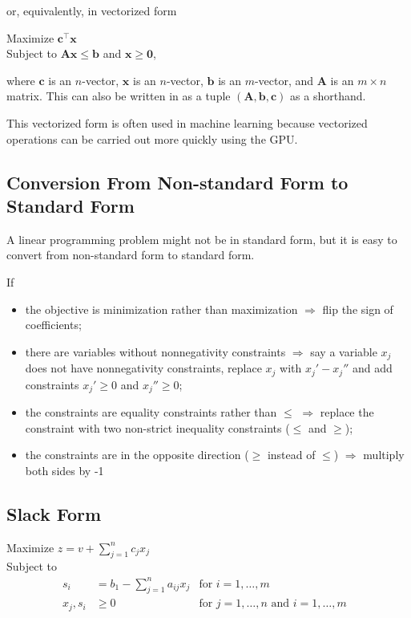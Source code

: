 or, equivalently, in vectorized form

Maximize $\mathbf{c}^\top \mathbf{x}$ \\
Subject to $\mathbf{A}\mathbf{x} \leq \mathbf{b}$ and $\mathbf{x} \geq \boldsymbol{0}$,

where $\mathbf{c}$ is an $n$-vector, $\mathbf{x}$ is an $n$-vector, $\mathbf{b}$ is an $m$-vector, and $\mathbf{A}$ is an $m \times n$ matrix. This can also be written in as a tuple $(\mathbf{A},\mathbf{b},\mathbf{c})$ as a shorthand.

This vectorized form is often used in machine learning because vectorized operations can be carried out more quickly using the GPU.

\subsection{Conversion From Non-standard Form to Standard Form}

A linear programming problem might not be in standard form, but it is easy to convert from non-standard form to standard form.

If \begin{itemize}
    \item the objective is minimization rather than maximization $\Rightarrow$ flip the sign of coefficients;
    \item there are variables without nonnegativity constraints $\Rightarrow$ say a variable $x_j$ does not have  nonnegativity constraints, replace $x_j$ with $x_j' - x_j''$ and add constraints $x_j' \geq 0$ and $x_j'' \geq 0$;
    \item the constraints are equality constraints rather than $\leq$ $\Rightarrow$ replace the constraint with two non-strict inequality constraints ($\leq$ and $\geq$);
    \item the constraints are in the opposite direction ($\geq$ instead of $\leq$) $\Rightarrow$ multiply both sides by -1 
\end{itemize}

\subsection{Slack Form}

Maximize $\displaystyle z = v + \sum_{j=1}^n c_j x_j$ \\
Subject to
\[
    \begin{aligned}
        s_i &= b_1 - \sum_{j=1}^n a_{ij} x_j & \text{for $i = 1,\ldots,m$} \\
        x_j,s_i &\geq 0 & \text{for $j = 1,\ldots,n$ and $i = 1,\ldots,m$ }
    \end{aligned}
\]


